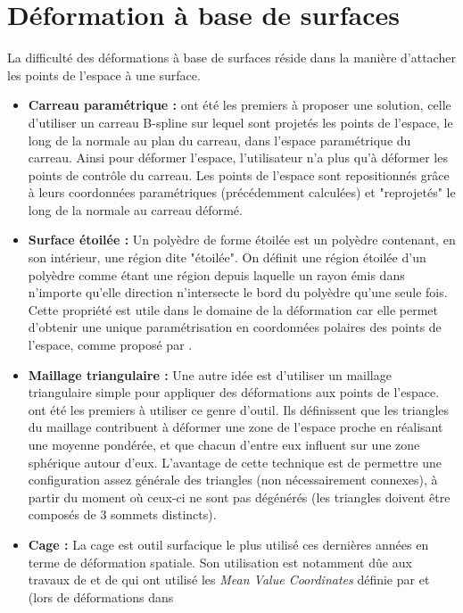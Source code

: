 \section{Déformation à base de surfaces}
La difficulté des déformations à base de surfaces réside dans la
manière d'attacher les points de l'espace à une surface.

\begin{itemize}
\item{\textbf{Carreau paramétrique :}} \cite{JLQ96} ont été les
  premiers à proposer une solution, celle d'utiliser un carreau
  B-spline sur lequel sont projetés les points de l'espace, le long de
  la normale au plan du carreau, dans l'espace paramétrique du
  carreau. Ainsi pour déformer l'espace, l'utilisateur n'a plus qu'à
  déformer les points de contrôle du carreau. Les points de l'espace
  sont repositionnés grâce à leurs coordonnées paramétriques
  (précédemment calculées) et "reprojetés" le long de la normale au
  carreau déformé.
\item{\textbf{Surface étoilée :}} Un polyèdre de forme étoilée est un
  polyèdre contenant, en son intérieur, une région dite "étoilée". On
  définit une région étoilée d'un polyèdre comme étant une région
  depuis laquelle un rayon émis dans n'importe qu'elle direction
  n'intersecte le bord du polyèdre qu'une seule fois. Cette propriété
  est utile dans le domaine de la déformation car elle permet
  d'obtenir une unique paramétrisation en coordonnées polaires des
  points de l'espace, comme proposé par \cite{JL00}.
\item{\textbf{Maillage triangulaire :}} Une autre idée est d'utiliser
  un maillage triangulaire simple pour appliquer des déformations aux
  points de l'espace. \cite{KO03} ont été les premiers à utiliser ce
  genre d'outil. Ils définissent que les triangles du maillage
  contribuent à déformer une zone de l'espace proche en réalisant une
  moyenne pondérée, et que chacun d'entre eux influent sur une zone
  sphérique autour d'eux. L'avantage de cette technique est de
  permettre une configuration assez générale des triangles (non
  nécessairement connexes), à partir du moment où ceux-ci ne sont pas
  dégénérés (les triangles doivent être composés de 3 sommets
  distincts).
\item{\textbf{Cage :}} La cage est outil surfacique le plus utilisé
  ces dernières années en terme de déformation spatiale. Son
  utilisation est notamment dûe aux travaux de \cite{JSW05} et de
  \cite{HF06} qui ont utilisé les \textit{Mean Value Coordinates}
  définie par \cite{Flo03} et \cite{FKR05} (lors de déformations dans

\end{itemize}

